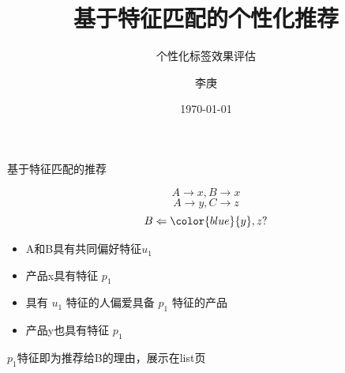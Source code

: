 \documentclass{beamer}
\begin{document}
\begin{CJK}{UTF8}{gbsn}

\title{基于特征匹配的个性化推荐}

\subtitle{个性化标签效果评估}

\author{李庚}


\date{\today}

\begin{frame}
  \titlepage
\end{frame}

\begin{frame}{基于特征匹配的推荐}

  $$ A \rightarrow x, B \rightarrow x $$
  $$ A \rightarrow y, C \rightarrow z $$
  $$ B \Leftarrow {\color{blue}{y}},z ? $$

  \begin{itemize}
  \item { A和B具有共同偏好特征$ u_1 $ }
  \item { 产品x具有特征 $ p_1 $ }
  \item { 具有 $ u_1 $ 特征的人偏爱具备 $ p_1 $ 特征的产品 }
  \item { 产品y也具有特征 $ p_1 $ }
  \end{itemize}

   { $ p_1 $特征即为推荐给B的理由，展示在list页 }

\end{frame}



\end{CJK}
\end{document}
